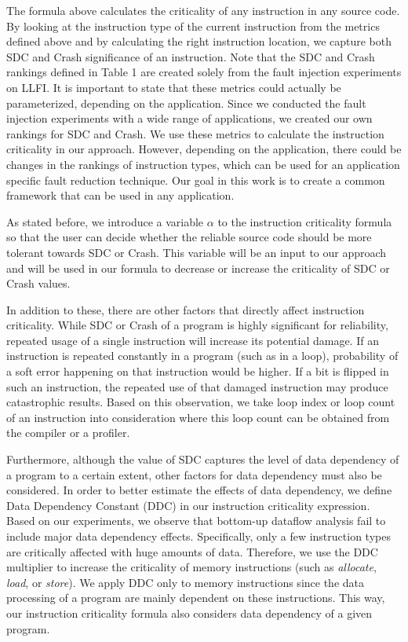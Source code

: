 The formula above calculates the criticality of any instruction in any source code. By looking at the instruction type of the current instruction from the metrics defined above and by calculating the right instruction location, we capture both SDC and Crash significance of an instruction. Note that the SDC and Crash rankings defined in Table 1 are created solely from the fault injection experiments on LLFI. It is important to state that these metrics could actually be parameterized, depending on the application. Since we conducted the fault injection experiments with a wide range of applications, we created our own rankings for SDC and Crash. We use these metrics to calculate the instruction criticality in our approach. However, depending on the application, there could be changes in the rankings of instruction types, which can be used for an application specific fault reduction technique. Our goal in this work is to create a common framework that can be used in any application.

As stated before, we introduce a variable $\alpha$ to the instruction criticality formula so that the user can decide whether the reliable source code should be more tolerant towards SDC or Crash. This variable will be an input to our approach and will be used in our formula to decrease or increase the criticality of SDC or Crash values. 

In addition to these, there are other factors that directly affect instruction criticality. While SDC or Crash of a program is highly significant for reliability, repeated usage of a single instruction will increase its potential damage. If an instruction is repeated constantly in a program (such as in a loop), probability of a soft error happening on that instruction would be higher. If a bit is flipped in such an instruction, the repeated use of that damaged instruction may produce catastrophic results. Based on this observation, we take loop index or loop count of an instruction into consideration where this loop count can be obtained from the compiler or a profiler. 

Furthermore, although the value of SDC captures the level of data dependency of a program to a certain extent, other factors for data dependency must also be considered. In order to better estimate the effects of data dependency, we define Data Dependency Constant (DDC) in our instruction criticality expression. Based on our experiments, we observe that bottom-up dataflow analysis fail to include major data dependency effects. Specifically, only a few instruction types are critically affected with huge amounts of data. Therefore, we use the DDC multiplier to increase the criticality of memory instructions (such as \emph{allocate}, \emph{load}, or \emph{store}). We apply DDC only to memory instructions since the data processing of a program are mainly dependent on these instructions. This way, our instruction criticality formula also considers data dependency of a given program.

